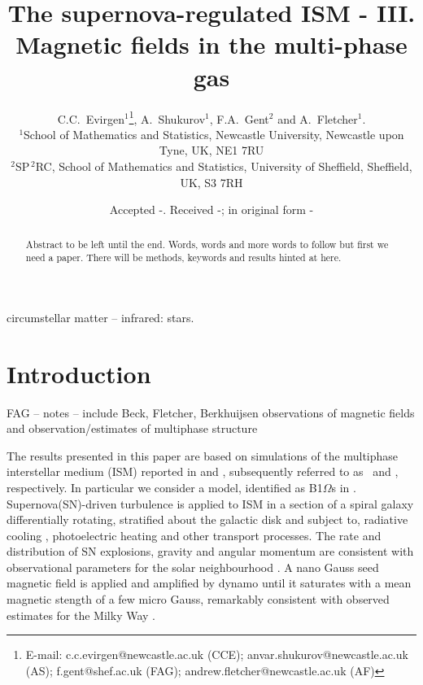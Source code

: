 \documentclass[useAMS,usenatbib]{mn2e}
\title[The supernova-regulated ISM - III. Magnetic fields in the multi-phase gas]{The supernova-regulated ISM - III. Magnetic fields in the multi-phase gas}
\author[C. C.~Evirgen, A.~Shukurov, F.A. Gent and A.~Fletcher]{C.C.~Evirgen$^{1}$\thanks{E-mail:
c.c.evirgen@newcastle.ac.uk (CCE); anvar.shukurov@newcastle.ac.uk (AS); 
f.gent@shef.ac.uk (FAG); andrew.fletcher@newcastle.ac.uk (AF)}, A.~Shukurov$^{1}$, F.A.~Gent$^{2}$ and A.~Fletcher$^{1}$.\\%
$^{1}$School of Mathematics and Statistics, Newcastle University,
Newcastle upon Tyne, UK, NE1 7RU\\
$^{2}$SP$^{\,2}$\!RC, School of Mathematics and Statistics, University of Sheffield, 
Sheffield, UK, S3 7RH}
\begin{document}
\newcommand{\bvec}[1]{\boldsymbol{#1}}
\newcommand{\avg}[1]{\left<\bvec{#1}\right>_{l}}
\date{Accepted -. Received -; in original form -}

\pagerange{\pageref{firstpage}--\pageref{lastpage}} 

\maketitle

\label{firstpage}

\begin{abstract}
Abstract to be left until the end. Words, words and more words to follow but first we need a paper. There will be methods, keywords and results hinted at here. 
\end{abstract}

\begin{keywords}
circumstellar matter -- infrared: stars.
\end{keywords}

\section{Introduction}

FAG -- notes -- include Beck, Fletcher, Berkhuijsen observations of magnetic 
fields \citep{2013AN....334..548B, MNR18065} and observation/estimates of multiphase structure \citep{dummy}
\citep{CS74,M077}

The results presented in this paper are based on simulations of the multiphase 
interstellar medium (ISM) reported in \citet{GSFSM13} and \citet{GSSFM13}, %
subsequently referred to as \HD\, and \MHD, respectively.
In particular we consider a model, identified as B1$\Omega$s in \MHD.
Supernova(SN)-driven turbulence is applied to ISM in a section of a spiral
galaxy differentially rotating, stratified about the galactic disk and subject
to, radiative cooling \citep{Sarazin87,Wolfire95}, photoelectric heating
\citep{Wolfire95} and other transport processes.
The rate and distribution of SN explosions, gravity \citep{Kuijken89} and 
angular momentum are consistent with observational parameters for the solar
neighbourhood \citep{F01}.
A nano Gauss seed magnetic field is applied and amplified by dynamo until it
saturates with a mean magnetic stength of a few micro Gauss, remarkably 
consistent with observed estimates for the Milky Way \citep{dummy}.
\end{document}
